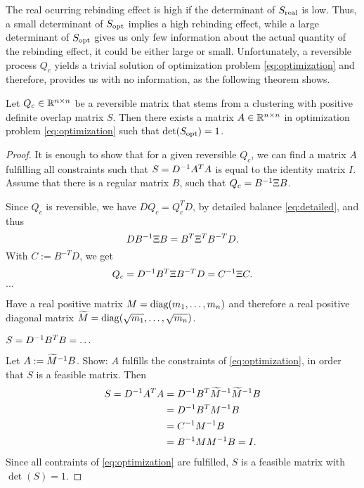 The real ocurring rebinding effect is high if the determinant of $S_{\mathrm{real}}$ is low. Thus, a small determinant of $S_{\mathrm{opt}}$ implies a high rebinding effect, while a large determinant of $S_{\mathrm{opt}}$ gives us only few information about the actual quantity of the rebinding effect, it could be either large or small.
Unfortunately, a reversible process $Q_c$ yields a trivial solution of optimization problem \eqref{eq:optimization} and therefore, provides us with no information, as the following theorem shows.
\begin{thm}
\label{thm:reversible_trivial}
Let $Q_c \in \mathbb{R}^{n \times n}$ be a reversible matrix that stems from a clustering with positive definite overlap matrix $S$. Then there exists a matrix $A \in \mathbb{R}^{n \times n}$ in optimization problem \eqref{eq:optimization} such that $\det(S_{\mathrm{opt}}) = 1$.
\end{thm}
\begin{proof}
It is enough to show that for a given reversible $Q_c$, we can find a matrix $A$ fulfilling all constraints such that $S=D^{-1} A^TA$ is equal to the identity matrix $I$.
\\

Assume that there is a regular matrix $B$, such that $Q_c = B^{-1} \Xi B$.

Since $Q_c$ is reversible, we have $DQ_c = Q_c^T D$, by detailed balance \eqref{eq:detailed}, and thus
\begin{equation*}
DB^{-1}\Xi B = B^T\Xi^T B^{-T}D.
\end{equation*}
With $C:= B^{-T}D$, we get
\begin{equation*}
Q_c = D^{-1} B^T \Xi B^{-T}D = C^{-1} \Xi C.
\end{equation*}
$\dots$

Have a real positive matrix $M = \mathrm{diag} (m_1,\dots,m_n)$  and therefore a real positive diagonal matrix $\widetilde{M} = \mathrm{diag} (\sqrt{m_1}, \dots, \sqrt{m_n})$.

$S = D^{-1} B^T B = \dots$

Let $A:= \widetilde{M}^{-1} B$. Show: $A$ fulfills the constraints of \eqref{eq:optimization}, in order that $S$ is a feasible matrix. Then
\begin{align*}
S = D^{-1} A^TA  & = D^{-1} B^T \widetilde{M}^{-1} \widetilde{M}^{-1} B \\
			 & = D^{-1} B^T M^{-1} B \\
		 	& = C^{-1} M^{-1} B         \\
			& = B^{-1} MM^{-1} B = I.
\end{align*}
Since all contraints of \eqref{eq:optimization} are fulfilled, $S$ is a feasible matrix with $\det(S) =1$.
\end{proof}

